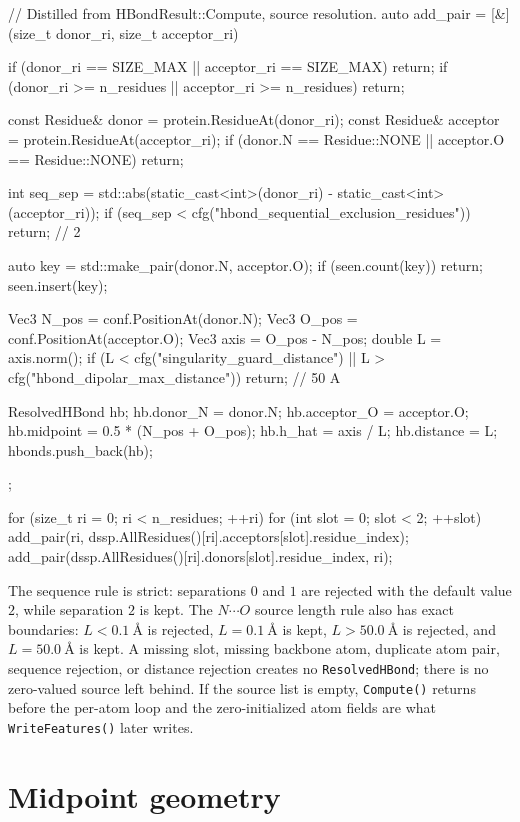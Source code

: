 \documentclass[11pt]{article}
\newcommand{\code}[1]{\texttt{#1}}
\begin{document}
\begin{codebox}
// Distilled from HBondResult::Compute, source resolution.
auto add_pair = [&](size_t donor_ri, size_t acceptor_ri) {
    if (donor_ri == SIZE_MAX || acceptor_ri == SIZE_MAX) return;
    if (donor_ri >= n_residues || acceptor_ri >= n_residues) return;

    const Residue& donor = protein.ResidueAt(donor_ri);
    const Residue& acceptor = protein.ResidueAt(acceptor_ri);
    if (donor.N == Residue::NONE || acceptor.O == Residue::NONE) return;

    int seq_sep = std::abs(static_cast<int>(donor_ri)
                         - static_cast<int>(acceptor_ri));
    if (seq_sep < cfg("hbond_sequential_exclusion_residues")) return; // 2

    auto key = std::make_pair(donor.N, acceptor.O);
    if (seen.count(key)) return;
    seen.insert(key);

    Vec3 N_pos = conf.PositionAt(donor.N);
    Vec3 O_pos = conf.PositionAt(acceptor.O);
    Vec3 axis = O_pos - N_pos;
    double L = axis.norm();
    if (L < cfg("singularity_guard_distance") ||
        L > cfg("hbond_dipolar_max_distance")) return;              // 50 A

    ResolvedHBond hb;
    hb.donor_N = donor.N;
    hb.acceptor_O = acceptor.O;
    hb.midpoint = 0.5 * (N_pos + O_pos);
    hb.h_hat = axis / L;
    hb.distance = L;
    hbonds.push_back(hb);
};

for (size_t ri = 0; ri < n_residues; ++ri) {
    for (int slot = 0; slot < 2; ++slot) {
        add_pair(ri, dssp.AllResidues()[ri].acceptors[slot].residue_index);
        add_pair(dssp.AllResidues()[ri].donors[slot].residue_index, ri);
    }
}
\end{codebox}

The sequence rule is strict: separations \(0\) and \(1\) are rejected with the
default value \(2\), while separation \(2\) is kept. The \(N\cdots O\) source
length rule also has exact boundaries: \(L<\SI{0.1}{\angstrom}\) is rejected,
\(L=\SI{0.1}{\angstrom}\) is kept, \(L>\SI{50.0}{\angstrom}\) is rejected, and
\(L=\SI{50.0}{\angstrom}\) is kept. A missing slot, missing backbone atom,
duplicate atom pair, sequence rejection, or distance rejection creates no
\code{ResolvedHBond}; there is no zero-valued source left behind. If the source
list is empty, \code{Compute()} returns before the per-atom loop and the
zero-initialized atom fields are what \code{WriteFeatures()} later writes.

\section{Midpoint geometry}
\end{document}

